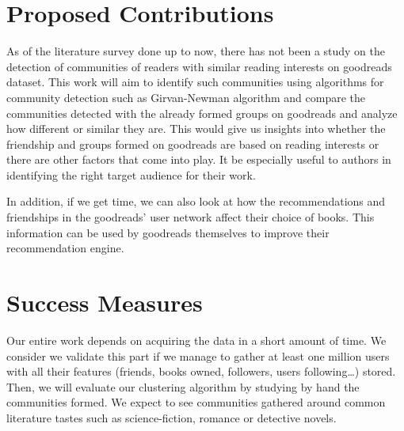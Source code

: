 \documentclass[11pt]{article}
\begin{document}







\section{Proposed Contributions}
As of the literature survey done up to now, there has not been a study on the detection of communities of readers with similar reading interests on goodreads dataset.
This work will aim to identify such communities using algorithms for community detection such as Girvan-Newman algorithm and compare the communities detected with the already formed groups on goodreads and analyze how different or similar they are.
This would give us insights into whether the friendship and groups formed on goodreads are based on reading interests or there are other factors that come into play. It be especially useful to authors in identifying the right target audience for their work.

In addition, if we get time, we can also look at how the recommendations and friendships in the goodreads' user network affect their choice of books. This information can be used by goodreads themselves to improve their recommendation engine.

\section{Success Measures}

Our entire work depends on acquiring the data in a short amount of time. We consider we validate this part if we manage to gather at least one million users with all their features (friends, books owned, followers, users following\dots) stored.\\
Then, we will evaluate our clustering algorithm by studying by hand the communities formed. We expect to see communities gathered around common literature tastes such as science-fiction, romance or detective novels. 
\end{document}
